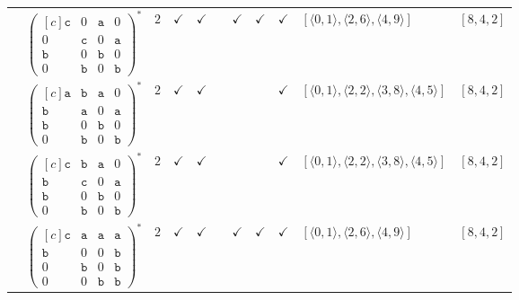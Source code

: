 \documentclass[12pt]{article}
\theoremstyle{definition}
\theoremstyle{plain}
\begin{document}
{\begin{longtable}{@{}cYcccccccZc@{}}
\cmidrule(lr){2-11}

& $\begin{pmatrix*}[c]
\mathtt{c}  &  0  &  \mathtt{a}  &  0  \\
0  &  \mathtt{c}  &  0  &  \mathtt{a}  \\
\mathtt{b}  &  0  &  \mathtt{b}  &  0  \\
0  &  \mathtt{b}  &  0  &  \mathtt{b}
\end{pmatrix*}^*$
& $2$
& $\checkmark$
& $\checkmark$
&
& $\checkmark$
& $\checkmark$
& $\checkmark$
& $[\langle0,1\rangle,\allowbreak\langle2,6\rangle,\allowbreak\langle4,9\rangle]$
& $[8,4,2]$\\

\cmidrule(lr){2-11}

& $\begin{pmatrix*}[c]
\mathtt{a}  &  \mathtt{b}  &  \mathtt{a}  &  0  \\
\mathtt{b}  &  \mathtt{a}  &  0  &  \mathtt{a}  \\
\mathtt{b}  &  0  &  \mathtt{b}  &  0  \\
0  &  \mathtt{b}  &  0  &  \mathtt{b}
\end{pmatrix*}^*$
& $2$
& $\checkmark$
& $\checkmark$
&
&
&
& $\checkmark$
& $[\langle0,1\rangle,\allowbreak\langle2,2\rangle,\allowbreak\langle3,8\rangle,\allowbreak\langle4,5\rangle]$
& $[8,4,2]$    \\

\cmidrule(lr){2-11}

& $\begin{pmatrix*}[c]
\mathtt{c}  &  \mathtt{b}  &  \mathtt{a}  &  0  \\
\mathtt{b}  &  \mathtt{c}  &  0  &  \mathtt{a}  \\
\mathtt{b}  &  0  &  \mathtt{b}  &  0  \\
0  &  \mathtt{b}  &  0  &  \mathtt{b}
\end{pmatrix*}^*$
& $2$
& $\checkmark$
& $\checkmark$
&
&
&
& $\checkmark$
& $[\langle0,1\rangle,\allowbreak\langle2,2\rangle,\allowbreak\langle3,8\rangle,\allowbreak\langle4,5\rangle]$
& $[8,4,2]$    \\

\cmidrule(lr){2-11}


& $\begin{pmatrix*}[c]
\mathtt{c}  &  \mathtt{a}  &  \mathtt{a}  &  \mathtt{a}  \\
\mathtt{b}  &  0  &  0  &  \mathtt{b}  \\
0  &  \mathtt{b}  &  0 &  \mathtt{b}  \\
0  &  0  &  \mathtt{b}  &  \mathtt{b}
\end{pmatrix*}^*$
& $2$
& $\checkmark$
& $\checkmark$
&
& $\checkmark$
& $\checkmark$
& $\checkmark$
& $[\langle0,1\rangle,\allowbreak\langle2,6\rangle,\allowbreak\langle4,9\rangle]$
& $[8,4,2]$\\


\end{longtable}}
\end{document}
